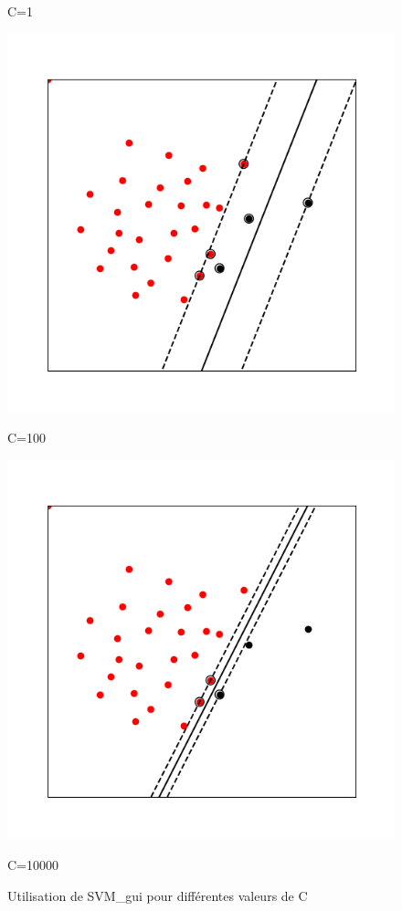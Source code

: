 \documentclass[11pt,a4paper]{article}
\begin{document}
\begin{figure}[H]
\begin{minipage}{0.24\textwidth}
        \caption*{C=1}
    \end{minipage}
    \hfill
    \begin{minipage}{0.24\textwidth}
        \centering
        \includegraphics[width=\textwidth]{images_plot/C100.png}
        \caption*{C=100}
    \end{minipage}
    \hfill
    \begin{minipage}{0.24\textwidth}
        \centering
        \includegraphics[width=\textwidth]{images_plot/C10000.png}
        \caption*{C=10000}
    \end{minipage}
    \caption{Utilisation de SVM\_gui pour différentes valeurs de C}
\end{figure}
\end{document}
